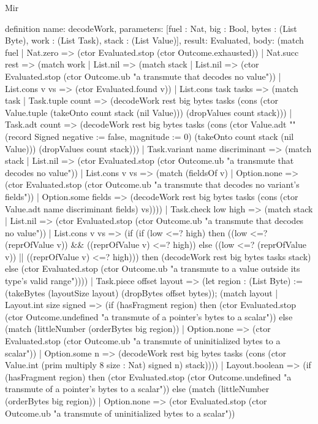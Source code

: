 \begin{lexlean}{Mir}
\begin{semanticmodule}
definition{
  name: decodeWork,
  parameters: [fuel : Nat, big : Bool, bytes : (List Byte), work : (List Task), stack : (List Value)],
  result: Evaluated,
  body: (match fuel
    | Nat.zero => (ctor Evaluated.stop (ctor Outcome.exhausted))
    | Nat.succ rest => (match work
      | List.nil => (match stack
        | List.nil => (ctor Evaluated.stop (ctor Outcome.ub "a transmute that decodes no value"))
        | List.cons v vs => (ctor Evaluated.found v))
      | List.cons task tasks => (match task
        | Task.tuple count => (decodeWork rest big bytes tasks (cons (ctor Value.tuple (takeOnto count stack (nil Value))) (dropValues count stack)))
        | Task.adt count => (decodeWork rest big bytes tasks (cons (ctor Value.adt "" (record Signed {negative := false, magnitude := 0}) (takeOnto count stack (nil Value))) (dropValues count stack)))
        | Task.variant name discriminant => (match stack
          | List.nil => (ctor Evaluated.stop (ctor Outcome.ub "a transmute that decodes no value"))
          | List.cons v vs => (match (fieldsOf v)
            | Option.none => (ctor Evaluated.stop (ctor Outcome.ub "a transmute that decodes no variant's fields"))
            | Option.some fields => (decodeWork rest big bytes tasks (cons (ctor Value.adt name discriminant fields) vs))))
        | Task.check low high => (match stack
          | List.nil => (ctor Evaluated.stop (ctor Outcome.ub "a transmute that decodes no value"))
          | List.cons v vs => (if (if (low <=? high) then ((low <=? (reprOfValue v)) && ((reprOfValue v) <=? high)) else ((low <=? (reprOfValue v)) || ((reprOfValue v) <=? high))) then (decodeWork rest big bytes tasks stack) else (ctor Evaluated.stop (ctor Outcome.ub "a transmute to a value outside its type's valid range"))))
        | Task.piece offset layout => (let region : (List Byte) := (takeBytes (layoutSize layout) (dropBytes offset bytes)); (match layout
          | Layout.int size signed => (if (hasFragment region) then (ctor Evaluated.stop (ctor Outcome.undefined "a transmute of a pointer's bytes to a scalar")) else (match (littleNumber (orderBytes big region))
            | Option.none => (ctor Evaluated.stop (ctor Outcome.ub "a transmute of uninitialized bytes to a scalar"))
            | Option.some n => (decodeWork rest big bytes tasks (cons (ctor Value.int (prim multiply 8 size : Nat) signed n) stack))))
          | Layout.boolean => (if (hasFragment region) then (ctor Evaluated.stop (ctor Outcome.undefined "a transmute of a pointer's bytes to a scalar")) else (match (littleNumber (orderBytes big region))
            | Option.none => (ctor Evaluated.stop (ctor Outcome.ub "a transmute of uninitialized bytes to a scalar"))
}
\end{semanticmodule}
\end{lexlean}
